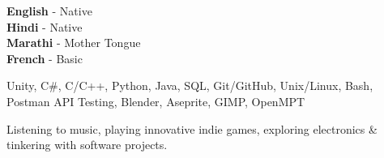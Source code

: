 \documentclass[9pt]{developercv}
\begin{document}
	
	\begin{minipage}[t]{0.3\textwidth}
		\vspace{-\baselineskip}
		
		
		\textbf{English} - Native\\
		\textbf{Hindi} - Native\\
		\textbf{Marathi} - Mother Tongue\\
		\textbf{French} - Basic
	\end{minipage}
	\hfill
	\begin{minipage}[t]{0.3\textwidth}
		\vspace{-\baselineskip}
		
		
		Unity, C\#, C/C++, Python, Java, SQL, Git/GitHub, Unix/Linux, Bash, Postman API Testing, Blender, Aseprite, GIMP, OpenMPT
	\end{minipage}
	\hfill
	\begin{minipage}[t]{0.3\textwidth}
		\vspace{-\baselineskip}
		
		
		Listening to music, playing innovative indie games, exploring electronics \& tinkering with software projects.
	\end{minipage}
	
	
\end{document}
